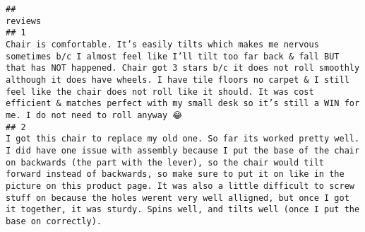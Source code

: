 \documentclass[
]{article}
\begin{document}
\begin{verbatim}
##                                                                                                                                                                                                                                                                                                                                                                                                                                                                                                                                                                                                                                                                                                                                                                                                                                                                                      reviews
## 1                                                                                                                                                                                                                                                                                                                                                                                                                                     Chair is comfortable. It’s easily tilts which makes me nervous sometimes b/c I almost feel like I’ll tilt too far back & fall BUT that has NOT happened. Chair got 3 stars b/c it does not roll smoothly although it does have wheels. I have tile floors no carpet & I still feel like the chair does not roll like it should. It was cost efficient & matches perfect with my small desk so it’s still a WIN for me. I do not need to roll anyway 😂
## 2                                                                                                                                                                                                                                                                                                                                                                    I got this chair to replace my old one. So far its worked pretty well. I did have one issue with assembly because I put the base of the chair on backwards (the part with the lever), so the chair would tilt forward instead of backwards, so make sure to put it on like in the picture on this product page. It was also a little difficult to screw stuff on because the holes werent very well alligned, but once I got it together, it was sturdy. Spins well, and tilts well (once I put the base on correctly).

\end{verbatim}
\end{document}
